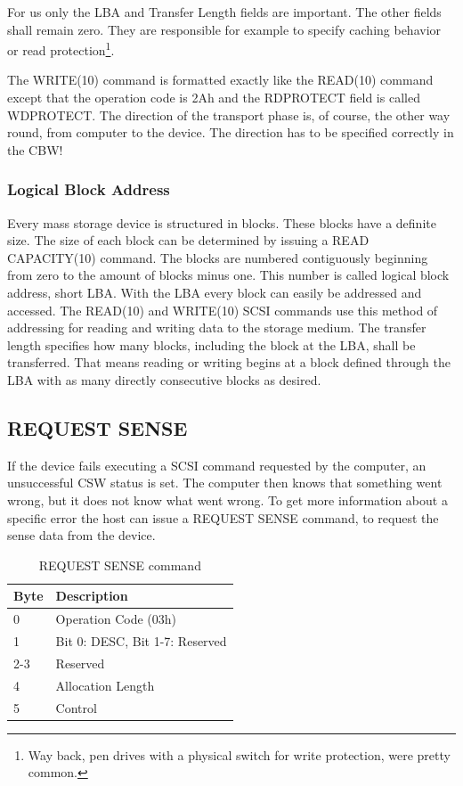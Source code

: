For us only the LBA and Transfer Length fields are important. The other fields shall remain zero. They are responsible for example to specify caching behavior or read protection\footnote{Way back, pen drives with a physical switch for write protection, were pretty common.}.

The WRITE(10) command is formatted exactly like the READ(10) command except that the operation code is 2Ah and the RDPROTECT field is called WDPROTECT. The direction of the transport phase is, of course, the other way round, from computer to the device. The direction has to be specified correctly in the CBW!

\subsubsection{Logical Block Address}

Every mass storage device is structured in blocks. These blocks have a definite size. The size of each block can be determined by issuing a READ CAPACITY(10) command. The blocks are numbered contiguously beginning from zero to the amount of blocks minus one. This number is called logical block address, short LBA. With the LBA every block can easily be addressed and accessed. The READ(10) and WRITE(10) SCSI commands use this method of addressing for reading and writing data to the storage medium. The transfer length specifies how many blocks, including the block at the LBA, shall be transferred. That means reading or writing begins at a block defined through the LBA with as many directly consecutive blocks as desired.

\subsection{REQUEST SENSE}

If the device fails executing a SCSI command requested by the computer, an unsuccessful CSW status is set. The computer then knows that something went wrong, but it does not know what went wrong. To get more information about a specific error the host can issue a REQUEST SENSE command, to request the sense data from the device.

\begin{table}[ht]
\caption{REQUEST SENSE command \cite{scsi_seagate}}
\centering
\begin{tabular}{|l|l|}
\hline\hline
\textbf{Byte} & \textbf{Description}\\ \hline
0 & Operation Code (03h)\\ \hline
1 & Bit 0: DESC, Bit 1-7: Reserved \\ \hline
2-3 & Reserved \\ \hline
4 & Allocation Length \\ \hline
5 & Control \\ \hline
\end{tabular}
\label{table:request_sense}
\end{table}

